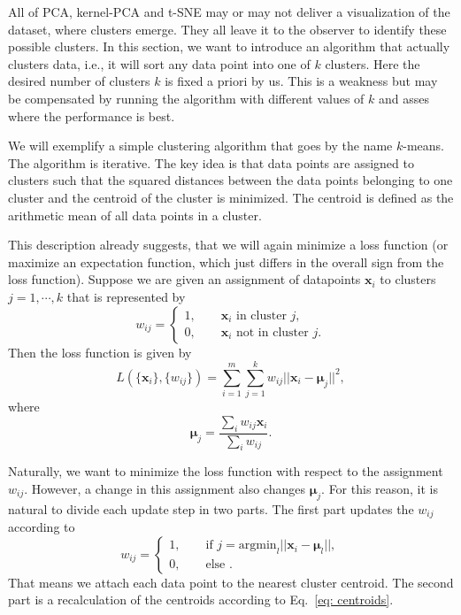 All of PCA, kernel-PCA and t-SNE may or may not deliver a visualization of the dataset, where clusters emerge. They all leave it to the observer to identify these possible clusters. 
In this section, we want to introduce an algorithm that actually clusters data, i.e., it will sort any data point into one of $k$ clusters. Here the desired number of clusters $k$ is fixed a priori by us. This is a weakness but may be compensated by running the algorithm with different values of $k$ and asses where the performance is best. 

We will exemplify a simple clustering algorithm that goes by the name $k$-means. The algorithm is iterative. The key idea is that data points are assigned to clusters such that the squared distances between the data points belonging to one cluster and the centroid of the cluster is minimized. The centroid is defined as the arithmetic mean of all data points in a cluster. 

This description already suggests, that we will again minimize a loss function (or maximize an expectation function, which just differs in the overall sign from the loss function).
Suppose we are given an assignment of datapoints $\bm{x}_i$ to clusters $j=1,\cdots, k$ that is represented by 
\begin{equation}
w_{ij}=\begin{cases}
1,\qquad \bm{x}_i\text{ in cluster }j,\\
0,\qquad \bm{x}_i\text{ not in cluster }j.
\end{cases}
\end{equation}
Then the loss function is given by
\begin{equation}
L(\{\bm{x}_i\},\{w_{ij}\})=\sum_{i=1}^m\sum_{j=1}^k w_{ij}||\bm{x}_i-\bm{\mu}_j ||^2,
\end{equation}
where 
\begin{equation}
\bm{\mu}_j=\frac{\sum_iw_{ij}\bm{x}_i}{\sum_iw_{ij}}.
\label{eq: centroids}
\end{equation}

Naturally, we want to minimize the loss function with respect to the assignment $w_{ij}$. However, a change in this assignment also changes $\bm{\mu}_j$. For this reason, it is natural to divide each update step in two parts. The first part updates the  $w_{ij}$ according to
\begin{equation}
w_{ij}=\begin{cases}
1,\qquad \text{if } j=\mathrm{argmin}_l ||\bm{x}_i-\bm{\mu}_l||,\\
0,\qquad \text{else }.
\end{cases}
\end{equation}
That means we attach each data point to the nearest cluster centroid.
The second part is a recalculation of the centroids according to Eq.~\eqref{eq: centroids}.

